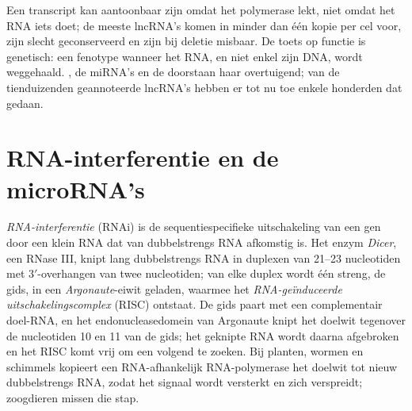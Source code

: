 \begin{remark}\label{rem:b3:rna-regulation:function}
Een transcript kan aantoonbaar zijn omdat het polymerase lekt, niet
omdat het RNA iets doet; de meeste lncRNA's komen in minder dan één
kopie per cel voor, zijn slecht geconserveerd en zijn bij deletie
misbaar. De toets op functie is genetisch: een fenotype wanneer het
RNA, en niet enkel zijn DNA, wordt weggehaald. \emph{}, de
miRNA's en de  doorstaan haar overtuigend; van de tienduizenden
geannoteerde lncRNA's hebben er tot nu toe enkele honderden dat gedaan.
\end{remark}

\section{RNA-interferentie en de microRNA's}

\begin{definition}\label{def:b3:rna-regulation:rnai}
\emph{RNA-interferentie} (RNAi) is de sequentiespecifieke
uitschakeling van een gen door een klein RNA dat van dubbelstrengs RNA
afkomstig is. Het enzym \emph{Dicer}, een RNase III, knipt lang
dubbelstrengs RNA in duplexen van \numrange{21}{23} nucleotiden met
3$'$-overhangen van twee nucleotiden; van elke duplex wordt één
streng, de gids, in een \emph{Argonaute}-eiwit geladen, waarmee het
\emph{RNA-geïnduceerde uitschakelingscomplex} (RISC) ontstaat. De gids
paart met een complementair doel-RNA, en het endonucleasedomein van
Argonaute knipt het doelwit tegenover de nucleotiden 10 en 11 van de
gids; het geknipte RNA wordt daarna afgebroken en het RISC komt vrij
om een volgend te zoeken. Bij planten, wormen en schimmels kopieert
een RNA-afhankelijk RNA-polymerase het doelwit tot nieuw dubbelstrengs
RNA, zodat het signaal wordt versterkt en zich verspreidt; zoogdieren
missen die stap.
\end{definition}

